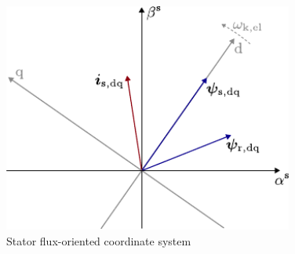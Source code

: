 \begin{frame}
\begin{columns}
\begin{column}{0.45\textwidth}
\begin{figure}
                \includegraphics[width=0.85\textwidth]{fig/lec06/K_coordinates_stator_flux_orientation.pdf}
                \caption{Stator flux-oriented coordinate system}
                \label{fig:K_coordinates_stator_flux_orientation}
            \end{figure}
        \end{column}
    \end{columns}
\end{frame}

